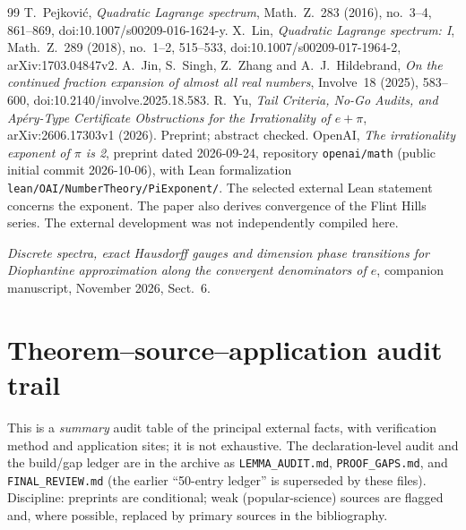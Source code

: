 \documentclass[11pt]{amsart}
\theoremstyle{definition}
\theoremstyle{remark}
\numberwithin{equation}{section}
\begin{document}
\begin{thebibliography}{99}
 T.~Pejkovi\'c, \emph{Quadratic Lagrange spectrum}, Math.~Z.~283 (2016), no.~3--4, 861--869, doi:10.1007/s00209-016-1624-y.
 X.~Lin, \emph{Quadratic Lagrange spectrum: I}, Math.~Z.~289 (2018), no.~1--2, 515--533, doi:10.1007/s00209-017-1964-2, arXiv:1703.04847v2.
 A.~Jin, S.~Singh, Z.~Zhang and A.~J.~Hildebrand, \emph{On the continued fraction expansion of almost all real numbers}, Involve~18 (2025), 583--600, doi:10.2140/involve.2025.18.583.
 R.~Yu, \emph{Tail Criteria, No-Go Audits, and Ap\'ery-Type Certificate Obstructions for the Irrationality of $e+\pi$}, arXiv:2606.17303v1 (2026). Preprint; abstract checked.
 OpenAI, \emph{The irrationality exponent of $\pi$ is 2}, preprint dated 2026-09-24, repository \texttt{openai/math} (public initial commit 2026-10-06), with Lean formalization \texttt{lean/OAI/NumberTheory/PiExponent/}. The selected external Lean statement concerns the exponent. The paper also derives convergence of the Flint Hills series. The external development was not independently compiled here.

 \emph{Discrete spectra, exact Hausdorff gauges and dimension phase transitions for Diophantine approximation along the convergent denominators of $e$}, companion manuscript, November 2026, Sect.~6.

\end{thebibliography}

\clearpage
\appendix

\section{Theorem--source--application audit trail}\label{app:audit}

This is a \emph{summary} audit table of the principal external facts, with verification method and application sites; it is not exhaustive. The declaration-level audit and the build/gap ledger are in the archive as \texttt{LEMMA\_AUDIT.md}, \texttt{PROOF\_GAPS.md}, and \texttt{FINAL\_REVIEW.md} (the earlier ``50-entry ledger'' is superseded by these files). Discipline: preprints are conditional; weak (popular-science) sources are flagged and, where possible, replaced by primary sources in the bibliography.
\end{document}
